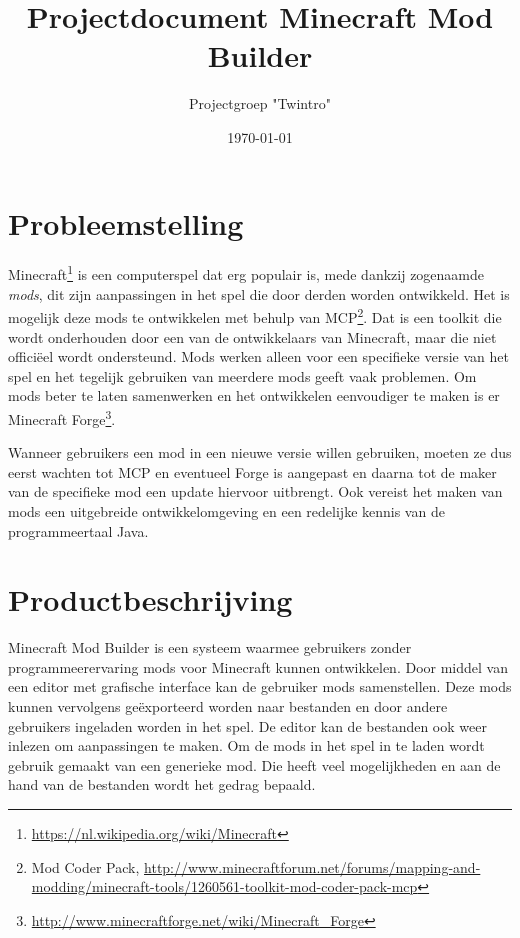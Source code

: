 \documentclass{article}
\begin{document}
\title{Projectdocument Minecraft Mod Builder}
\author{Projectgroep "Twintro"}
\date{\today}

\maketitle

\tableofcontents

\newpage

\section{Probleemstelling}
	Minecraft\footnote{\url{https://nl.wikipedia.org/wiki/Minecraft}} is een computerspel dat erg populair is, mede dankzij zogenaamde \emph{mods}, dit zijn aanpassingen in het spel die door derden worden ontwikkeld. Het is mogelijk deze mods te ontwikkelen met behulp van MCP\footnote{Mod Coder Pack, \url{http://www.minecraftforum.net/forums/mapping-and-modding/minecraft-tools/1260561-toolkit-mod-coder-pack-mcp}}. Dat is een toolkit die wordt onderhouden door een van de ontwikkelaars van Minecraft, maar die niet offici\"eel wordt ondersteund. Mods werken alleen voor een specifieke versie van het spel en het tegelijk gebruiken van meerdere mods geeft vaak problemen. Om mods beter te laten samenwerken en het ontwikkelen eenvoudiger te maken is er Minecraft Forge\footnote{\url{http://www.minecraftforge.net/wiki/Minecraft_Forge}}.
	
	Wanneer gebruikers een mod in een nieuwe versie willen gebruiken, moeten ze dus eerst wachten tot MCP en eventueel Forge is aangepast en daarna tot de maker van de specifieke mod een update hiervoor uitbrengt. Ook vereist het maken van mods een uitgebreide ontwikkelomgeving en een redelijke kennis van de programmeertaal Java.

\section{Productbeschrijving}
	Minecraft Mod Builder is een systeem waarmee gebruikers zonder programmeerervaring mods voor Minecraft kunnen ontwikkelen. Door middel van een editor met grafische interface kan de gebruiker mods samenstellen. Deze mods kunnen vervolgens ge\"exporteerd worden naar bestanden en door andere gebruikers ingeladen worden in het spel. De editor kan de bestanden ook weer inlezen om aanpassingen te maken. Om de mods in het spel in te laden wordt gebruik gemaakt van een generieke mod. Die heeft veel mogelijkheden en aan de hand van de bestanden wordt het gedrag bepaald.
	
\end{document}
